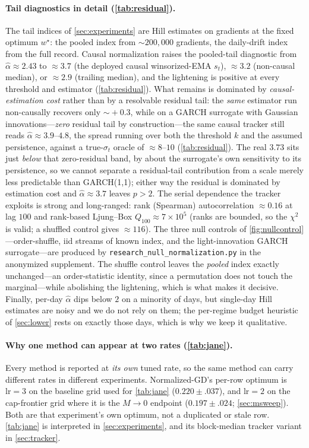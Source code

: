 \documentclass{article}
\begin{document}
\paragraph{Tail diagnostics in detail (\cref{tab:residual}).} The tail indices of
\cref{sec:experiments} are Hill estimates on gradients at the fixed optimum $w^\star$: the
pooled index from ${\sim}200{,}000$ gradients, the daily-drift index from the full record.
Causal normalization raises the pooled-tail diagnostic from $\hat\alpha\approx2.43$ to
$\approx3.7$ (the deployed
causal winsorized-EMA $s_t$), $\approx3.2$ (non-causal median), or $\approx2.9$ (trailing
median), and the lightening is positive at every threshold and estimator (\cref{tab:residual}).
What remains is dominated by \emph{causal-estimation cost} rather than by a resolvable residual
tail: the \emph{same} estimator run non-causally recovers only $\sim\!+0.3$, while on a GARCH
surrogate with Gaussian innovations---\emph{zero} residual tail by construction---the same
causal tracker still reads $\hat\alpha\approx3.9$--$4.8$, the spread running over both the
threshold $k$ and the assumed persistence, against a true-$\sigma_t$ oracle of $\approx8$--$10$
(\cref{tab:residual}). The real $3.73$ sits just \emph{below} that zero-residual band, by about the
surrogate's own sensitivity to its persistence, so we cannot separate a residual-tail
contribution from a scale merely less predictable than GARCH(1,1); either way the residual
is dominated by estimation cost and $\hat\alpha\approx3.7$ leaves $p>2$. The serial dependence
the tracker exploits is strong and long-ranged: rank (Spearman) autocorrelation
$\approx0.16$ at lag $100$ and rank-based Ljung--Box $Q_{100}\approx7\!\times\!10^{5}$ (ranks
are bounded, so the $\chi^2$ is valid; a shuffled control gives $\approx116$). The three null
controls of \cref{fig:nullcontrol}---order-shuffle, iid streams of known index, and the
light-innovation GARCH surrogate---are produced by
\texttt{research\_null\_normalization.py} in the anonymized supplement. The shuffle control
leaves the \emph{pooled} index exactly unchanged---an order-statistic identity, since a
permutation does not touch the marginal---while abolishing the lightening, which is what makes
it decisive. Finally, per-day
$\hat\alpha$ dips below $2$ on a minority of days, but single-day Hill estimates are noisy and
we do not rely on them; the per-regime budget heuristic of \cref{sec:lower} rests on exactly
those days, which is why we keep it qualitative.

\paragraph{Why one method can appear at two rates (\cref{tab:jane}).} Every method is
reported at \emph{its own} tuned rate, so the same method can carry different rates in
different experiments. Normalized-GD's per-row optimum is $\mathrm{lr}{=}3$ on the baseline
grid used for \cref{tab:jane} ($0.220\!\pm\!.037$), and $\mathrm{lr}{=}2$ on the cap-frontier
grid where it is the $M\!\to\!0$ endpoint ($0.197\!\pm\!.024$; \cref{sec:msweep}). Both are
that experiment's own optimum, not a duplicated or stale row. \cref{tab:jane} is
interpreted in \cref{sec:experiments}, and its block-median tracker variant in
\cref{sec:tracker}.
\end{document}

